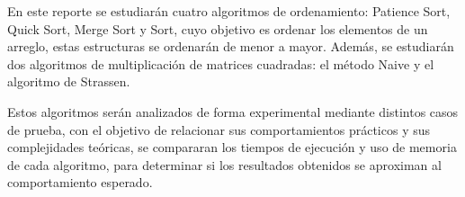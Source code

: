 En este reporte se estudiarán cuatro algoritmos de ordenamiento: Patience Sort, Quick Sort, Merge Sort y Sort, cuyo objetivo es ordenar los elementos de un arreglo, estas estructuras se ordenarán de menor a mayor. Además, se estudiarán dos algoritmos de multiplicación de matrices cuadradas: el método Naive y el algoritmo de Strassen. 

Estos algoritmos serán analizados de forma experimental mediante distintos casos de prueba, con el objetivo de relacionar sus comportamientos prácticos y sus complejidades teóricas, se compararan los tiempos de ejecución y uso de memoria de cada algoritmo, para determinar si los resultados obtenidos se aproximan al comportamiento esperado.